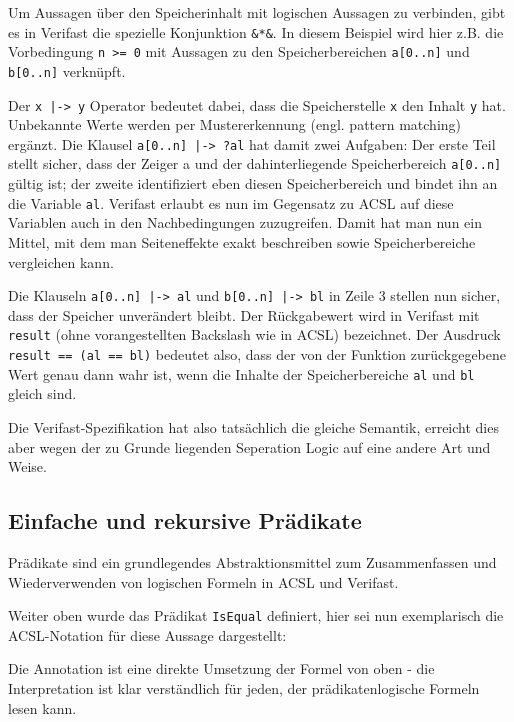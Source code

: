 Um Aussagen über den Speicherinhalt mit logischen Aussagen zu verbinden, gibt es in Verifast die spezielle 
Konjunktion \lstinline{&*&}. In diesem Beispiel wird hier z.B. die Vorbedingung \lstinline{n >= 0} mit Aussagen
zu den Speicherbereichen \lstinline{a[0..n]} und \lstinline{b[0..n]} verknüpft.

Der \lstinline{x |-> y} Operator bedeutet dabei, dass die Speicherstelle \lstinline{x} den Inhalt \lstinline{y} hat.
Unbekannte Werte werden per Mustererkennung (engl. pattern matching) ergänzt. Die Klausel
\lstinline{a[0..n] |-> ?al} hat damit zwei Aufgaben: Der erste Teil stellt sicher, dass der Zeiger a und
der dahinterliegende Speicherbereich \lstinline{a[0..n]} gültig ist; der zweite identifiziert eben diesen 
Speicherbereich und bindet ihn an die Variable \lstinline{al}.
Verifast erlaubt es nun im Gegensatz zu ACSL auf diese Variablen auch in den Nachbedingungen zuzugreifen. Damit
hat man nun ein Mittel, mit dem man Seiteneffekte exakt beschreiben sowie Speicherbereiche vergleichen kann.

Die Klauseln \lstinline{a[0..n] |-> al} und \lstinline{b[0..n] |-> bl} in Zeile 3 stellen nun sicher, dass der
Speicher unverändert bleibt. Der Rückgabewert wird in Verifast mit \lstinline{result} (ohne vorangestellten 
Backslash wie in ACSL) bezeichnet. Der Ausdruck \lstinline{result == (al == bl)} bedeutet also, dass der von der Funktion
zurückgegebene Wert genau dann wahr ist, wenn die Inhalte der Speicherbereiche \lstinline{al} und \lstinline{bl} 
gleich sind.

Die Verifast-Spezifikation hat also tatsächlich die gleiche Semantik, erreicht dies aber wegen der zu Grunde
liegenden Seperation Logic auf eine andere Art und Weise.



\subsection{Einfache und rekursive Prädikate}
\label{sec:design-by-contract:predicates}

Prädikate sind ein grundlegendes Abstraktionsmittel zum Zusammenfassen und Wiederverwenden von logischen 
Formeln in ACSL und Verifast.

Weiter oben wurde das Prädikat \lstinline{IsEqual} definiert, hier sei nun exemplarisch die ACSL-Notation
für diese Aussage dargestellt:



Die Annotation ist eine direkte Umsetzung der Formel von oben - die Interpretation ist klar verständlich für 
jeden, der prädikatenlogische Formeln lesen kann.

